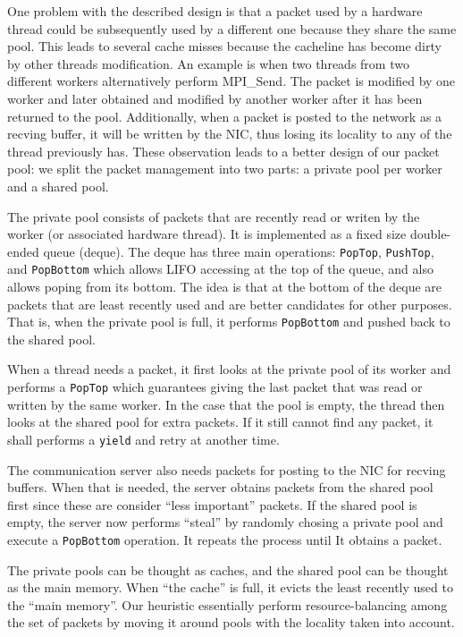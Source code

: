 \documentclass[11pt]{article}
\begin{document}
One problem with the described design is that a packet used by a hardware
thread could be subsequently used by a different one because they share the
same pool. This leads to several cache misses because the cacheline has become
dirty by other threads modification. An example is when two threads from two
different workers alternatively perform MPI_Send. The packet is modified by one
worker and later obtained and modified by another worker after it has been
returned to the pool. Additionally, when a packet is posted to the network as
a recving buffer, it will be written by the NIC, thus losing its locality to
any of the thread previously has. These observation leads to a better design
of our packet pool: we split the packet management into two parts: a private
pool per worker and a shared pool.

The private pool consists of packets that are recently read or writen by the
worker (or associated hardware thread). It is implemented as a fixed size
double-ended queue (deque). The deque has three main operations:
\texttt{PopTop}, \texttt{PushTop}, and \texttt{PopBottom} which allows LIFO
accessing at the top of the queue, and also allows poping from its bottom. The
idea is that at the bottom of the deque are packets that are least recently
used and are better candidates for other purposes. That is, when the private
pool is full, it performs \texttt{PopBottom} and pushed back to
the shared pool.

When a thread needs a packet, it first looks at the private pool of its worker
and performs a \texttt{PopTop} which guarantees giving the last packet that
was read or written by the same worker. In the case that the pool is empty,
the thread then looks at the shared pool for extra packets. If it still cannot
find any packet, it shall performs a \texttt{yield} and retry at another time.

The communication server also needs packets for posting to the NIC for recving
buffers. When that is needed, the server obtains packets from the shared pool
first since these are consider ``less important'' packets. If the shared pool
is empty, the server now performs ``steal'' by randomly chosing a private pool
and execute a \texttt{PopBottom} operation. It repeats the process until It obtains
a packet.

The private pools can be thought as caches, and the shared pool can be thought
as the main memory. When ``the cache'' is full, it evicts the least recently
used to the ``main memory''. Our heuristic essentially perform
resource-balancing among the set of packets by moving it around pools with the
locality taken into account.
\end{document}
